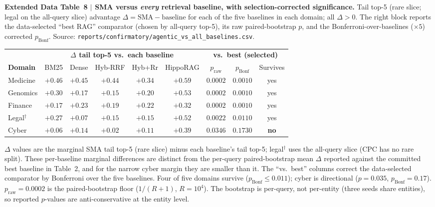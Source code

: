 \documentclass[pdflatex,sn-nature]{sn-jnl}
\newcommand{\edcaption}[1]{\par{\small #1}\par\smallskip}
\begin{document}
\begin{appendices}
\begin{table}[htbp]
\centering
\edcaption{\textbf{Extended Data Table~8 $|$ SMA versus \emph{every} retrieval
    baseline, with selection-corrected significance.}
  Tail top-5 (rare slice; legal on the all-query slice) advantage
  $\Delta=\text{SMA}-\text{baseline}$ for each of the five baselines in each
  domain; all $\Delta>0$. The right block reports the data-selected ``best RAG''
  comparator (chosen by all-query top-5), its raw paired-bootstrap $p$, and the
  Bonferroni-over-baselines ($\times 5$) corrected $p_\text{Bonf}$.
  Source: \texttt{reports/confirmatory/agentic\_vs\_all\_baselines.csv}.}
\small
\setlength{\tabcolsep}{4pt}
\begin{adjustbox}{max width=\textwidth}\begin{tabular}{lccccc cc c}
\toprule
 & \multicolumn{5}{c}{\textbf{$\Delta$ tail top-5 vs.\ each baseline}}
   & \multicolumn{3}{c}{\textbf{vs.\ best (selected)}} \\
\cmidrule(lr){2-6}\cmidrule(lr){7-9}
\textbf{Domain} & BM25 & Dense & Hyb-RRF & Hyb+Rr & HippoRAG
  & $p_\text{raw}$ & $p_\text{Bonf}$ & Survives \\
\midrule
Medicine & $+0.46$ & $+0.45$ & $+0.44$ & $+0.34$ & $+0.59$ & $0.0002$ & $0.0010$ & yes \\
Genomics & $+0.30$ & $+0.17$ & $+0.15$ & $+0.20$ & $+0.53$ & $0.0002$ & $0.0010$ & yes \\
Finance  & $+0.17$ & $+0.23$ & $+0.19$ & $+0.22$ & $+0.32$ & $0.0002$ & $0.0010$ & yes \\
Legal$^\dagger$ & $+0.27$ & $+0.07$ & $+0.15$ & $+0.15$ & $+0.52$ & $0.0022$ & $0.0110$ & yes \\
Cyber    & $+0.06$ & $+0.14$ & $+0.02$ & $+0.11$ & $+0.39$ & $0.0346$ & $0.1730$ & \textbf{no} \\
\bottomrule
\end{tabular}\end{adjustbox}
\begin{flushleft}
{\footnotesize
$\Delta$ values are the marginal SMA tail top-5 (rare slice) minus each
baseline's tail top-5; legal$^\dagger$ uses the all-query slice (CPC has no rare
split). These per-baseline marginal differences are distinct from the per-query
paired-bootstrap mean $\Delta$ reported against the committed best baseline in
Table~2, and for the narrow cyber margin they are smaller than it. The
``vs.\ best'' columns correct the data-selected comparator by Bonferroni over
the five baselines. Four of five domains survive ($p_\text{Bonf}\le 0.011$);
cyber is directional ($p=0.035$, $p_\text{Bonf}=0.17$). $p_\text{raw}=0.0002$ is
the paired-bootstrap floor ($1/(R{+}1)$, $R=10^4$). The bootstrap is per-query,
not per-entity (three seeds share entities), so reported $p$-values are
anti-conservative at the entity level.}
\end{flushleft}
\label{tab:ed8_vs_all_baselines}
\end{table}



\end{appendices}
\end{document}
